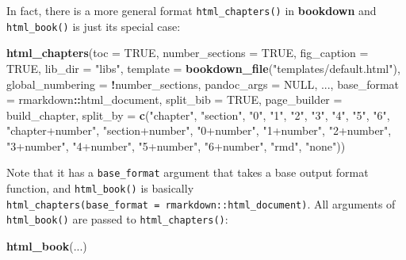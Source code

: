 \documentclass[
  12pt,
]{krantz}
\newenvironment{Shaded}{\begin{snugshade}}{\end{snugshade}}
\newcommand{\AttributeTok}[1]{\textcolor[rgb]{0.13,0.29,0.53}{#1}}
\newcommand{\ConstantTok}[1]{\textcolor[rgb]{0.56,0.35,0.01}{#1}}
\newcommand{\FunctionTok}[1]{\textcolor[rgb]{0.13,0.29,0.53}{\textbf{#1}}}
\newcommand{\NormalTok}[1]{#1}
\newcommand{\SpecialCharTok}[1]{\textcolor[rgb]{0.81,0.36,0.00}{\textbf{#1}}}
\newcommand{\StringTok}[1]{\textcolor[rgb]{0.31,0.60,0.02}{#1}}
\newcounter{none} %
\theoremstyle{definition}
\theoremstyle{definition}
\theoremstyle{definition}
\theoremstyle{definition}
\theoremstyle{remark}
\begin{document}
In fact, there is a more general format \texttt{html\_chapters()} in \textbf{bookdown} and \texttt{html\_book()} is just its special case:

\begin{Shaded}
\begin{Highlighting}[]
\FunctionTok{html\_chapters}\NormalTok{(}\AttributeTok{toc =} \ConstantTok{TRUE}\NormalTok{, }\AttributeTok{number\_sections =} \ConstantTok{TRUE}\NormalTok{, }\AttributeTok{fig\_caption =} \ConstantTok{TRUE}\NormalTok{,}
  \AttributeTok{lib\_dir =} \StringTok{"libs"}\NormalTok{, }\AttributeTok{template =} \FunctionTok{bookdown\_file}\NormalTok{(}\StringTok{"templates/default.html"}\NormalTok{),}
  \AttributeTok{global\_numbering =} \SpecialCharTok{!}\NormalTok{number\_sections, }\AttributeTok{pandoc\_args =} \ConstantTok{NULL}\NormalTok{,}
\NormalTok{  ..., }\AttributeTok{base\_format =}\NormalTok{ rmarkdown}\SpecialCharTok{::}\NormalTok{html\_document, }\AttributeTok{split\_bib =} \ConstantTok{TRUE}\NormalTok{,}
  \AttributeTok{page\_builder =}\NormalTok{ build\_chapter, }\AttributeTok{split\_by =} \FunctionTok{c}\NormalTok{(}\StringTok{"chapter"}\NormalTok{,}
    \StringTok{"section"}\NormalTok{, }\StringTok{"0"}\NormalTok{, }\StringTok{"1"}\NormalTok{, }\StringTok{"2"}\NormalTok{, }\StringTok{"3"}\NormalTok{, }\StringTok{"4"}\NormalTok{, }\StringTok{"5"}\NormalTok{, }\StringTok{"6"}\NormalTok{, }\StringTok{"chapter+number"}\NormalTok{,}
    \StringTok{"section+number"}\NormalTok{, }\StringTok{"0+number"}\NormalTok{, }\StringTok{"1+number"}\NormalTok{, }\StringTok{"2+number"}\NormalTok{,}
    \StringTok{"3+number"}\NormalTok{, }\StringTok{"4+number"}\NormalTok{, }\StringTok{"5+number"}\NormalTok{, }\StringTok{"6+number"}\NormalTok{,}
    \StringTok{"rmd"}\NormalTok{, }\StringTok{"none"}\NormalTok{))}
\end{Highlighting}
\end{Shaded}

Note that it has a \texttt{base\_format} argument that takes a base output format function, and \texttt{html\_book()} is basically \texttt{html\_chapters(base\_format\ =\ rmarkdown::html\_document)}. All arguments of \texttt{html\_book()} are passed to \texttt{html\_chapters()}:

\begin{Shaded}
\begin{Highlighting}[]
\FunctionTok{html\_book}\NormalTok{(...)}
\end{Highlighting}
\end{Shaded}
\end{document}
